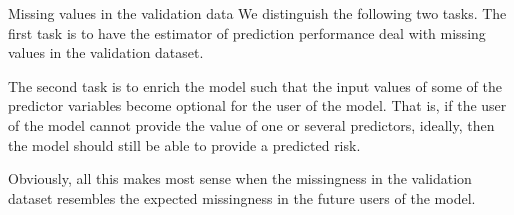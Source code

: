 \documentclass{beamer}\usepackage{listings}
\begin{document}
\begin{frame}[label={sec:orgcb84473}]{Missing values in the validation data}
We distinguish the following two tasks.
\vfill
The first task is
to have the estimator of prediction performance deal with missing values in the
validation dataset.

\vfill

The second task is to enrich the model such that
the input values of some of the predictor variables become optional
for the user of the model.
\vfill
That is, if the user of the model cannot provide the value of one or several predictors, ideally, then the
model should still be able to provide a predicted risk. 
\vfill

Obviously, all this makes most sense when the missingness in the
validation dataset resembles the expected missingness in the future
users of the model.
\end{frame}
\end{document}
